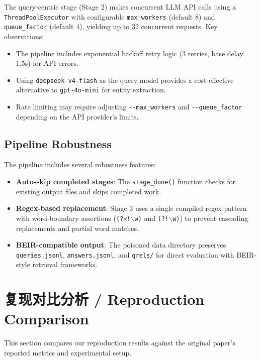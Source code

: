 \documentclass[11pt,a4paper]{article}
\begin{document}
The query-centric stage (Stage 2) makes concurrent LLM API calls using a
\texttt{ThreadPoolExecutor} with configurable \texttt{max\_workers} (default 8)
and \texttt{queue\_factor} (default 4), yielding up to 32 concurrent requests.
Key observations:
\begin{itemize}[nosep]
  \item The pipeline includes exponential backoff retry logic (3 retries,
        base delay 1.5s) for API errors.
  \item Using \texttt{deepseek-v4-flash} as the query model provides a
        cost-effective alternative to \texttt{gpt-4o-mini} for entity extraction.
  \item Rate limiting may require adjusting \texttt{-{}-max\_workers} and
        \texttt{-{}-queue\_factor} depending on the API provider's limits.
\end{itemize}

\subsection{Pipeline Robustness}

The pipeline includes several robustness features:
\begin{itemize}[nosep]
  \item \textbf{Auto-skip completed stages}: The \texttt{stage\_done()} function
        checks for existing output files and skips completed work.
  \item \textbf{Regex-based replacement}: Stage 3 uses a single compiled regex
        pattern with word-boundary assertions (\texttt{(?<!$\backslash$w)} and
        \texttt{(?!$\backslash$w)}) to prevent cascading replacements and partial
        word matches.
  \item \textbf{BEIR-compatible output}: The poisoned data directory preserves
        \texttt{queries.jsonl}, \texttt{answers.jsonl}, and \texttt{qrels/} for
        direct evaluation with BEIR-style retrieval frameworks.
\end{itemize}

\section{复现对比分析 / Reproduction Comparison}

This section compares our reproduction results against the original paper's
reported metrics and experimental setup.
\end{document}
